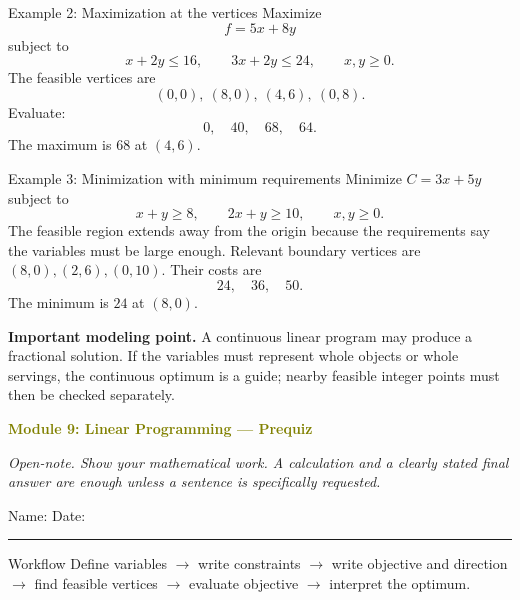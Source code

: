 \documentclass[11pt]{article}
\newcommand{\prequizhead}[2]{%
  \clearpage
  {\Large\bfseries\textcolor{olive}{Module #1: #2 — Prequiz}}\par
  \textit{Open-note. Show your mathematical work. A calculation and a clearly stated final answer are enough unless a sentence is specifically requested.}\par
  Name: \hspace{2.6in} Date: \hspace{1.1in}\par
  \vspace{2pt}\textcolor{gold}{\rule{\linewidth}{1.2pt}}\par\smallskip
}
\begin{document}
\begin{examplebox}{Example 2: Maximization at the vertices}
Maximize
\[
f=5x+8y
\]
subject to
\[
x+2y\le16,
\qquad
3x+2y\le24,
\qquad x,y\ge0.
\]
The feasible vertices are
\[
(0,0),\ (8,0),\ (4,6),\ (0,8).
\]
Evaluate:
\[
0,\quad40,\quad68,\quad64.
\]
The maximum is \(68\) at \((4,6)\).
\end{examplebox}

\begin{examplebox}{Example 3: Minimization with minimum requirements}
Minimize \(C=3x+5y\) subject to
\[
x+y\ge8,
\qquad
2x+y\ge10,
\qquad x,y\ge0.
\]
The feasible region extends away from the origin because the requirements say the variables must be large enough. Relevant boundary vertices are \((8,0),(2,6),(0,10)\). Their costs are
\[
24,\quad36,\quad50.
\]
The minimum is \(24\) at \((8,0)\).
\end{examplebox}

\textbf{Important modeling point.} A continuous linear program may produce a fractional solution. If the variables must represent whole objects or whole servings, the continuous optimum is a guide; nearby feasible integer points must then be checked separately.

\prequizhead{9}{Linear Programming}
\begin{refbox}{Workflow}
Define variables \(\to\) write constraints \(\to\) write objective and direction \(\to\) find feasible vertices \(\to\) evaluate objective \(\to\) interpret the optimum.
\end{refbox}
\end{document}
